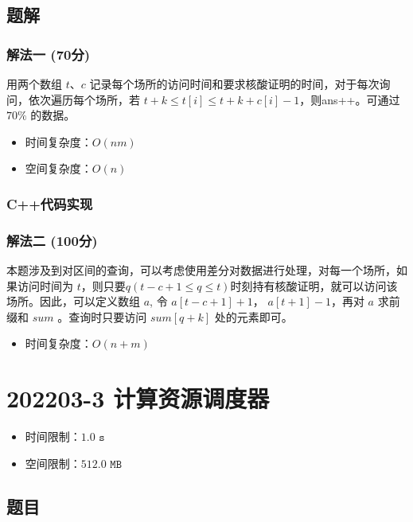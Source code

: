 \documentclass[UTF8, 12pt, a4paper, oneside]{ctexart}
\begin{document}
\subsection{题解}
\subsubsection{解法一 (70分)}
\par 用两个数组 $t$、$c$ 记录每个场所的访问时间和要求核酸证明的时间，对于每次询问，依次遍历每个场所，若 $t + k \leq t[i] \leq t + k + c[i] - 1$，则ans++。可通过 $70\%$ 的数据。
\begin{itemize}
    \item 时间复杂度：$O(nm)$
    \item 空间复杂度：$O(n)$
\end{itemize}
\subsubsection{C++代码实现}

\subsubsection{解法二 (100分)}
\par 本题涉及到对区间的查询，可以考虑使用差分对数据进行处理，对每一个场所，如果访问时间为 $t$，则只要$q (t-c+1 \leq q \leq t)$时刻持有核酸证明，就可以访问该场所。因此，可以定义数组 $a$, 令 $a[t-c+1]+1$， $a[t+1]-1$，再对 $a$ 求前缀和 $sum$ 。查询时只要访问 $sum[q+k]$ 处的元素即可。
\begin{itemize}
    \item 时间复杂度：$O(n+m)$
\end{itemize}


\section{202203-3 计算资源调度器}
\begin{itemize}
    \item 时间限制：$1.0\texttt{ s}$
    \item 空间限制：$512.0\texttt{ MB}$
\end{itemize}
\subsection{题目}
\end{document}
